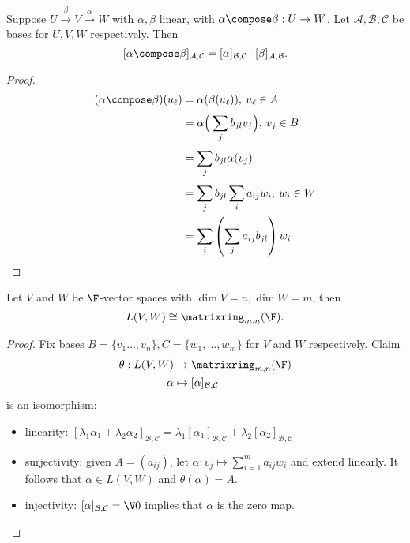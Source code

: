 \documentclass[a4paper]{article}
\newcommand*{\M}{\matrixring}
\newcommand*{\basis}{\mathcal}
\theoremstyle{definition}
\begin{document}
\begin{lemma}
  Suppose \(U \stackrel{\beta}{\to} V \stackrel{\alpha}{\to} W\) with \(\alpha, \beta\) linear, with \(\alpha \compose \beta: U\to W\). Let \(\basis A, \basis B, \basis C\) be bases for \(U,V,W\) respectively. Then
  \[
    [\alpha\compose\beta]_{\basis A, \basis C} = [\alpha]_{\basis B,\basis C}\cdot[\beta]_{\basis A, \basis B}.
  \]
\end{lemma}

\begin{proof}
  \begin{align*}
    (\alpha\compose\beta)(u_\ell) &= \alpha(\beta(u_\ell)), \: u_\ell\in A\\
                                  &= \alpha\Big( \sum_{j}^{ }b_{jl}v_j \Big), \: v_j\in B \\
                                  &= \sum_{j}^{ }b_{jl}\alpha(v_j) \\
                                  &= \sum_{j}^{ }b_{jl}\sum_{i}^{ }a_{ij}w_i, \: w_i\in W \\
                                  &= \sum_{i}^{ }\left( \sum_{j}^{ }a_{ij}b_{jl} \right)w_i
  \end{align*}
\end{proof}

\begin{proposition}
  Let \(V\) and \(W\) be \(\F\)-vector spaces with \(\dim V = n, \dim W = m\), then
  \[
L(V,W) \cong \M_{m,n}(\F).
  \]
\end{proposition}

\begin{proof}
  Fix bases \(B=\{v_1\ldots,v_n\}, C=\{w_1,\ldots,w_m\}\) for \(V\) and \(W\) respectively. Claim
  \begin{align*}
    \theta: L(V,W) &\to \M_{m,n}(\F) \\
    \alpha &\mapsto [\alpha]_{\basis B, \basis C}
  \end{align*}
  is an isomorphism:
  \begin{itemize}
  \item linearity: \([\lambda_1\alpha_1 + \lambda_2\alpha_2]_{\basis B, \basis C} = \lambda_1[\alpha_1]_{\basis B, \basis C} + \lambda_2[\alpha_2]_{\basis B, \basis C}\).
  \item surjectivity: given \(A = (a_{ij})\), let \(\alpha:v_j\mapsto \sum_{i=1}^{m}a_{ij}w_i \) and extend linearly. It follows that \(\alpha\in L(V,W)\) and \(\theta(\alpha) = A\).
  \item injectivity: \([\alpha]_{\basis B, \basis C} = \V 0\) implies that \(\alpha\) is the zero map.
  \end{itemize}
\end{proof}
\end{document}
